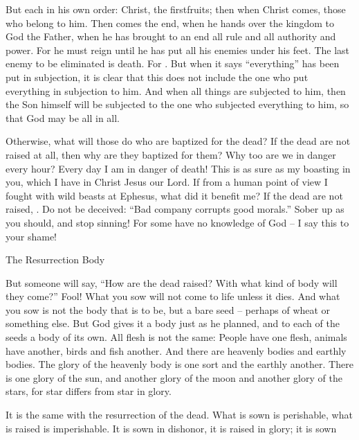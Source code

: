 {But
each
in
his own
order: Christ,
the firstfruits;
then
when Christ
comes,
those who belong to him.
Then
comes the end,
when
he hands over
the kingdom
to God
the Father,
when
he has brought to an end
all
rule
and
all
authority
and
power.
For
he must
reign
until
he has put
all
his enemies
under
his
feet.
The last
enemy
to be eliminated
is death.
For
{}. But
when
it says
“everything”
has been put in subjection,
it is clear
that
this does not include
the one who put
everything
in subjection
to him.
And
when
all things
are subjected
to him,
then
the
Son
himself
will be subjected
to the one who subjected
everything
to him,
so that
God
may be all
in
all.
\par }{\PP {}Otherwise,
what
will
those do
who are baptized
for
the dead? If
the dead
are
not
raised
at all,
then
why
are they baptized
for
them?
Why
too
are
we
in danger
every
hour?
Every
day
I am in danger of death! This is as sure as my boasting
in you,
which
I have
in
Christ
Jesus
our
Lord.
If
from
a human
point of view I fought with wild beasts
at
Ephesus,
what
did it benefit
me? If
the dead
are
not
raised,
{}.
Do
not
be deceived: “Bad
company
corrupts
good
morals.”
Sober up
as you should, and
stop
sinning! For
some
have
no knowledge
of God
– I say
this to
your
shame!
\par }{\SH The Resurrection Body
\par }{\PP {}But
someone
will say,
“How
are
the dead
raised? With what kind
of body
will they come?”
Fool! What
you
sow
will
not
come to life
unless
it dies.
And
what
you sow
is not
the body
that is to be,
but
a bare
seed –
perhaps
of wheat
or
something
else.
But
God
gives
it
a body
just
as he planned,
and
to each
of the seeds
a body
of its own.
All
flesh
is not
the same: People
have one flesh, animals
have another, birds
and
fish another.
And
there are heavenly
bodies
and
earthly
bodies. The glory
of the heavenly
body is one sort and
the earthly
another.
There is one
glory
of the sun,
and
another
glory
of the moon
and
another
glory
of the stars,
for
star
differs
from star
in
glory.
\par }{\PP {}It is the same with
the resurrection
of the dead.
What is sown
is perishable,
what is raised
is imperishable.
It is sown
in
dishonor,
it is raised
in
glory;
it is sown
}
